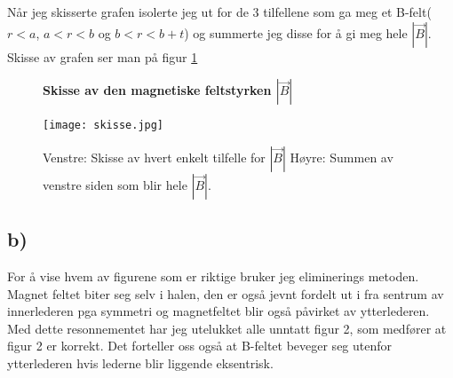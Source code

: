 \documentclass[a4paper,12pt,norsk]{article}
\begin{document}
Når jeg skisserte grafen isolerte jeg ut for de 3 tilfellene som ga meg et B-felt($r<a$, $a<r<b$ og $b<r<b+t$) og summerte jeg disse for å gi meg hele $|\vec{B}|$.
Skisse av grafen ser man på figur \ref{skisse}

\begin{figure}
\centering
\textbf{Skisse av den magnetiske feltstyrken $|\vec{B}|$}\par\medskip
\texttt{[image: skisse.jpg]} 
\caption{Venstre: Skisse av hvert enkelt tilfelle for $|\vec{B}|$ Høyre: Summen av venstre siden som blir hele $|\vec{B}|$. }
\label{skisse}
\end{figure}

\subsection{b)}
For å vise hvem av figurene som er riktige bruker jeg eliminerings metoden. Magnet feltet biter seg selv i halen, den er også jevnt fordelt ut i fra sentrum av innerlederen pga symmetri og magnetfeltet blir også påvirket av ytterlederen. Med dette resonnementet har jeg utelukket alle unntatt figur 2, som medfører at figur 2 er korrekt. Det forteller oss også at B-feltet beveger seg utenfor ytterlederen hvis lederne blir liggende eksentrisk. 
\end{document}
